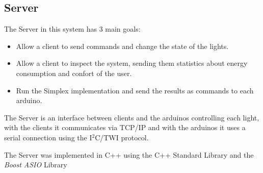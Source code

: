\subsection{Server}
\label{sec:Server}

The Server in this system has 3 main goals:
\begin{itemize}
    \item Allow a client to send commands and change the state of the lights.
    \item Allow a client to inspect the system, sending them statistics about energy consumption and confort of the user.
    \item Run the Simplex implementation and send the results as commands to each arduino.
\end{itemize}

The Server is an interface between clients and the arduinos controlling each light, with the clients it communicates via TCP/IP and with the arduinos it uses a serial connection using the I$^2$C/TWI protocol.






The Server was implemented in C++ using the C++ Standard Library and the \emph{Boost ASIO} Library \cite{BoostSite}
